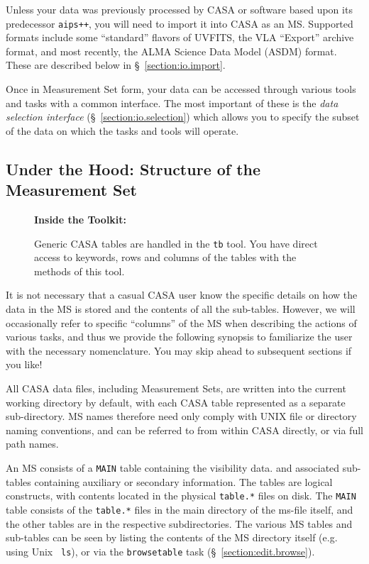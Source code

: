 Unless your data was previously processed by CASA or software based
upon its predecessor {\tt aips++}, you will need to import it into
CASA as an MS.  Supported formats include some ``standard'' flavors
of UVFITS, the VLA ``Export'' archive format, and most recently,
the ALMA Science Data Model (ASDM) format.  These are described below
in \S~\ref{section:io.import}.

Once in Measurement Set form, your data can be accessed through various tools
and tasks with a common interface.  The most important of these is the {\em
data selection interface} (\S~\ref{section:io.selection}) which allows you to
specify the subset of the data on which the tasks and tools will
operate.


\subsection{Under the Hood: Structure of the Measurement Set}
\label{section:io.ms.structure}

\begin{wrapfigure}{r}{2.5in}
  \begin{boxedminipage}{2.5in}
     \centerline{\bf Inside the Toolkit:}
     Generic CASA tables are handled in the {\tt tb} tool.
     You have direct access to keywords, rows and columns of
     the tables with the methods of this tool.
  \end{boxedminipage}
\end{wrapfigure}

It is not necessary that a casual CASA user know the specific details
on how the data in the MS is stored and the contents of all the
sub-tables.  However, we will occasionally refer to specific
``columns'' of the MS when describing the actions of various tasks,
and thus we provide the following synopsis to familiarize the user
with the necessary nomenclature.  You may skip ahead to subsequent
sections if you like!

All CASA data files, including Measurement Sets, are written into
the current working directory by default, with each CASA table
represented as a separate sub-directory.  MS names therefore need only
comply with UNIX file or directory naming conventions, and can be
referred to from within CASA directly, or via full path names.

An MS consists of a {\tt MAIN} table containing the visibility data. 
and associated sub-tables containing auxiliary or secondary
information.  The tables are logical constructs, with
contents located in the physical {\tt table.*} files on disk.  The
{\tt MAIN} table consists of the {\tt table.*} files in the main
directory of the ms-file itself, and the other tables are in the 
respective subdirectories.  The various MS tables and sub-tables can be seen by
listing the contents of the MS directory itself (e.g. using Unix {\tt
ls}), or via the {\tt browsetable} task (\S~\ref{section:edit.browse}).

